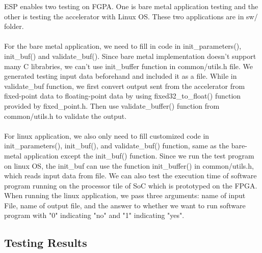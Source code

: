 \documentclass{sig-alternate}
\begin{document}
ESP enables two testing on FGPA. One is bare metal application testing and the other is testing the accelerator with Linux OS. These two applications are in sw/ folder. \\
\\
For the bare metal application, we need to fill in code in init\_parameters(), init\_buf() and validate\_buf(). Since bare metal implementation doesn't support many C librabries, we can't use init\_buffer function in common/utils.h file. We generated testing input data beforehand and included it as a file. While in validate\_buf function, we first convert output sent from the accelerator from fixed-point data to floating-point data by using fixed32\_to\_float() function provided by fixed\_point.h. Then use validate\_buffer() function from common/utils.h to validate the output. \\
\\
For linux application, we also only need to fill customized code in init\_parameters(), init\_buf(), and validate\_buf() function, same as the bare-metal application except the init\_buf() function. Since we run the test program on linux OS,  the init\_buf can use the function init\_buffer() in common/utils.h, which reads input data from file. We can also test the execution time of software program running on the processor tile of SoC which is prototyped on the FPGA. When running the linux application, we pass three arguments: name of input File, name of output file, and the answer to whether we want to run software program with "0" indicating "no" and "1" indicating "yes". 
\\
\subsection{Testing Results}
\end{document}
